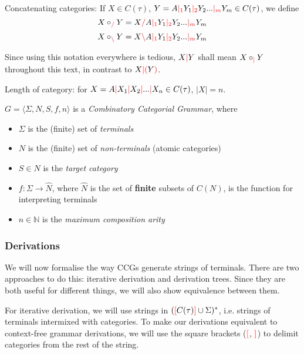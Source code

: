 \documentclass[main.tex]{subfiles}
\begin{document}
\begin{defn}
    Concatenating categories: If $X \in C(\tau)$,
    $Y = A \textcolor{red}{|_{1}} Y_1 \textcolor{red}{|_{2}} Y_2 ... \textcolor{red}{|_{m}} Y_m \in C(\tau)$, we define
    \[ X \circ_{\textcolor{red}{/}} Y = X \textcolor{red}{/} A \textcolor{red}{|_{1}} Y_1 \textcolor{red}{|_{2}} Y_2 ... \textcolor{red}{|_{m}} Y_m \]
    \[ X \circ_{\textcolor{red}{\backslash}} Y = X \textcolor{red}{\backslash} A \textcolor{red}{|_{1}} Y_1 \textcolor{red}{|_{2}} Y_2 ... \textcolor{red}{|_{m}} Y_m \]
\end{defn}

\begin{convention}
    Since using this notation everywhere is tedious, $X \textcolor{red}{|} Y$ shall mean
    $X \circ_{\textcolor{red}{|}} Y$ throughout this text, in contrast to
    $X \textcolor{red}{|} \textcolor{red}{(} Y \textcolor{red}{)}$.
\end{convention}

\begin{defn}
    Length of category: for $X = A \textcolor{red}{|} X_1 \textcolor{red}{|} X_2 \textcolor{red}{|} ... \textcolor{red}{|} X_n \in C(\tau)$,
    $|X| = n$.
\end{defn}

\begin{defn}
    $ G = \langle \Sigma, N, S, f, n \rangle $ is a \emph{Combinatory Categorial Grammar}, where
    \begin{itemize}
        \item $ \Sigma $ is the (finite) set of \emph{terminals}
        \item $ N $ is the (finite) set of \emph{non-terminals} (atomic categories)
        \item $ S \in N $ is the \emph{target category}
        \item $ f : \Sigma \rightarrow \hat{N} $, where $\hat{N}$ is the set of
            \textbf{finite} subsets of $C(N)$, is the function for interpreting
            terminals
        \item $ n \in \mathbb{N} $ is the \emph{maximum composition arity}
    \end{itemize}
\end{defn}

\subsubsection{Derivations}

We will now formalise the way CCGs generate strings of terminals. There
are two approaches to do this: iterative derivation and derivation trees. Since
they are both useful for different things, we will also show equivalence
between them.

For iterative derivation, we will use strings in $(\textcolor{red}{[} C(\tau) \textcolor{red}{]} \cup \Sigma)^*$,
i.e. strings of terminals intermixed with categories. To make our derivations
equivalent to context-free grammar derivations, we will use the square
brackets ($\textcolor{red}{[}$, $\textcolor{red}{]}$) to delimit categories from the rest of the string.
\end{document}
